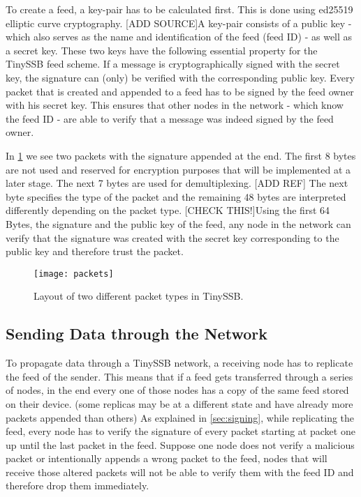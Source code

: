 To create a feed, a key-pair has to be calculated first. This is done using ed25519 elliptic curve cryptography. [ADD SOURCE]A key-pair consists of a public key - which also serves as the name and identification of the feed (feed ID) - as well as a secret key. These two keys have the following essential property for the TinySSB feed scheme. If a message is cryptographically signed with the secret key, the signature can (only) be verified with the corresponding public key. Every packet that is created and appended to a feed has to be signed by the feed owner with his secret key. This ensures that other nodes in the network - which know the feed ID - are able to verify that a message was indeed signed by the feed owner.

In \cref{fig:packets} we see two packets with the signature appended at the end. The first 8 bytes are not used and reserved for encryption purposes that will be implemented at a later stage. The next 7 bytes are used for demultiplexing. [ADD REF] The next byte specifies the type of the packet and the remaining 48 bytes are interpreted differently depending on the packet type. [CHECK THIS!]Using the first 64 Bytes, the signature and the public key of the feed, any node in the network can verify that the signature was created with the secret key corresponding to the public key and therefore trust the packet.\\

\begin{figure}
\centering
\texttt{[image: packets]}
\caption{Layout of two different packet types in TinySSB.}
\label{fig:packets}
\end{figure}

\subsection{Sending Data through the Network}
\label{sec:sending}
To propagate data through a TinySSB network, a receiving node has to replicate the feed of the sender. This means that if a feed gets transferred through a series of nodes, in the end every one of those nodes has a copy of the same feed stored on their device. (some replicas may be at a different state and have already more packets appended than others) As explained in \cref{sec:signing}, while replicating the feed, every node has to verify the signature of every packet starting at packet one up until the last packet in the feed. Suppose one node does not verify a malicious packet or intentionally appends a wrong packet to the feed, nodes that will receive those altered packets will not be able to verify them with the feed ID and therefore drop them immediately.

